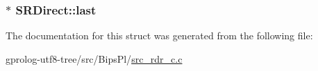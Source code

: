 \subsubsection[{\texorpdfstring{last}{last}}]{$\ast$ S\+R\+Direct\+::last}\hypertarget{structSRDirect_aadd740950d79ebfff5baee79c33ced18}{}\label{structSRDirect_aadd740950d79ebfff5baee79c33ced18}


The documentation for this struct was generated from the following file\+:\begin{DoxyCompactItemize}
\item 
gprolog-\/utf8-\/tree/src/\+Bips\+Pl/\hyperlink{src__rdr__c_8c}{src\+\_\+rdr\+\_\+c.\+c}\end{DoxyCompactItemize}
